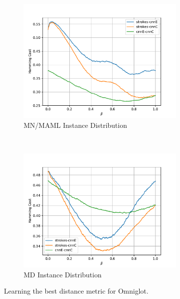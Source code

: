\begin{figure}[H]
  \begin{subfigure}[b]{0.5\textwidth}
    \centering
    \includegraphics[width=0.9\textwidth]{plots/omniglot_MAML_results}
    \caption{MN/MAML Instance Distribution}
    \label{fig:dl-omniglot-maml}
  \end{subfigure}
  ~
  \begin{subfigure}[b]{0.5\textwidth}
    \centering
    \includegraphics[width=0.9\textwidth]{plots/omniglot_MD2_results}
    \caption{MD Instance Distribution}
    \label{fig:dl-omniglot-md}
  \end{subfigure}
  \caption{Learning the best distance metric for Omniglot.}
  \label{fig:dl-omniglot}
\end{figure}
